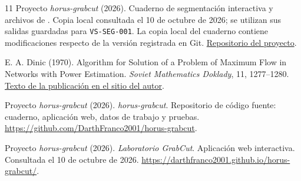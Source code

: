 \begin{thebibliography}{11}
Proyecto \textit{horus-grabcut} (2026).
Cuaderno de segmentación interactiva 
y archivos de .
Copia local consultada el 10 de octubre de 2026; se utilizan sus salidas
guardadas para \texttt{VS-SEG-001}. La copia local del cuaderno contiene
modificaciones respecto de la versión registrada en Git.
\href{https://github.com/DarthFranco2001/horus-grabcut}{Repositorio del proyecto}.

E. A. Dinic (1970).
Algorithm for Solution of a Problem of Maximum Flow in Networks
with Power Estimation. \textit{Soviet Mathematics Doklady}, 11, 1277--1280.
\href{https://www.cs.bgu.ac.il/~dinitz/D70.pdf}{Texto de la publicación en el sitio del autor}.

Proyecto \textit{horus-grabcut} (2026).
\textit{horus-grabcut}. Repositorio de código fuente: cuaderno,
aplicación web, datos de trabajo y pruebas.
\url{https://github.com/DarthFranco2001/horus-grabcut}.

Proyecto \textit{horus-grabcut} (2026).
\textit{Laboratorio GrabCut}. Aplicación web interactiva.
Consultada el 10 de octubre de 2026.
\url{https://darthfranco2001.github.io/horus-grabcut/}.

\end{thebibliography}

